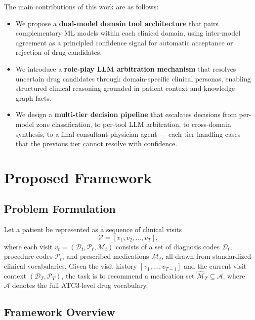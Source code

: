 \documentclass[sigconf,anonymous]{acmart}
\begin{document}
The main contributions of this work are as follows:

\begin{itemize}
\item We propose a \textbf{dual-model domain tool architecture} that pairs complementary ML models within each clinical domain, using inter-model agreement as a principled confidence signal for automatic acceptance or rejection of drug candidates.

\item We introduce a \textbf{role-play LLM arbitration mechanism} that resolves uncertain drug candidates through domain-specific clinical personas, enabling structured clinical reasoning grounded in patient context and knowledge graph facts.

\item We design a \textbf{multi-tier decision pipeline} that escalates decisions from per-model zone classification, to per-tool LLM arbitration, to cross-domain synthesis, to a final consultant-physician agent — each tier handling cases that the previous tier cannot resolve with confidence.
\end{itemize}

\section{Proposed Framework}

\subsection{Problem Formulation}

Let a patient be represented as a sequence of clinical visits
\begin{equation}
\mathcal{V} = [v_1, v_2, \ldots, v_T],
\end{equation}
where each visit $v_t = (\mathcal{D}_t, \mathcal{P}_t, \mathcal{M}_t)$ consists of a set of diagnosis codes $\mathcal{D}_t$, procedure codes $\mathcal{P}_t$, and prescribed medications $\mathcal{M}_t$, all drawn from standardized clinical vocabularies. Given the visit history $[v_1, \ldots, v_{T-1}]$ and the current visit context $(\mathcal{D}_T, \mathcal{P}_T)$, the task is to recommend a medication set $\hat{\mathcal{M}}_T \subseteq \mathcal{A}$, where $\mathcal{A}$ denotes the full ATC3-level drug vocabulary.

\subsection{Framework Overview}
\end{document}
